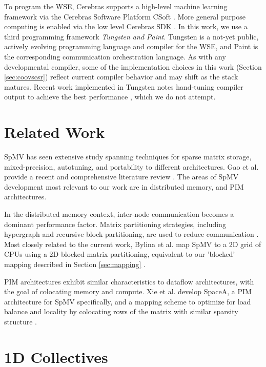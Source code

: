 \documentclass[conference]{IEEEtran}
\begin{document}
To program the WSE, Cerebras supports a high-level machine learning framework via the Cerebras Software Platform CSoft \cite{csoft_platform}. More general purpose computing is enabled via the low level Cerebras SDK \cite{cerebras_sdk_whitepaper}. In this work, we use a third programming framework \textit{Tungsten and Paint}. Tungsten is a not-yet public, actively evolving programming
language and compiler for the WSE, and Paint is the corresponding communication orchestration language. As with any developmental compiler, some of the implementation choices in this work (Section \ref{sec:coovscsr}) reflect current compiler behavior and may shift as the stack matures. Recent work implemented in Tungsten notes hand-tuning compiler
output to achieve the best performance
\cite{wse_md}, which we do not attempt.

\section{Related Work }
SpMV has seen extensive study spanning techniques for sparse matrix storage, mixed-precision, autotuning, and portability to different architectures. Gao et al. provide a recent and comprehensive literature review \cite{gao2024systematicliteraturesurveysparse}. The areas of SpMV development most relevant to our work are in distributed memory, and PIM architectures.

In the distributed memory context, inter-node communication becomes a dominant performance factor. Matrix partitioning strategies, including hypergraph and recursive block partitioning, are used to reduce communication \cite{hypergraphforspmv,hypergraphcatalyurek,hypergraph,recursiveblock}. Most closely related to the current work, Bylina et al. map SpMV to a 2D grid of CPUs using a 2D blocked matrix partitioning, equivalent to our 'blocked' mapping described in Section \ref{sec:mapping} \cite{2dpartitioningspmv}.

PIM architectures exhibit similar characteristics to dataflow architectures, with the goal of colocating memory and compute. Xie et al. develop SpaceA, a PIM architecture for SpMV specifically, and a mapping scheme to optimize for load balance and locality by colocating rows of the matrix with similar sparsity structure \cite{PIM-spaceA}.

\section{1D Collectives}
\label{sec:colls}
\end{document}
